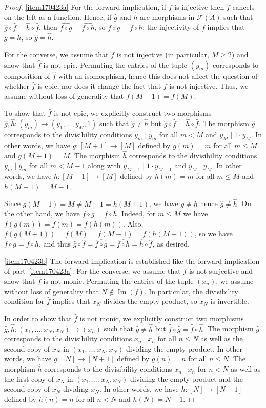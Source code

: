\documentclass[reqno]{amsart}
\theoremstyle{plain}
\theoremstyle{definition}
\newcommand{\im}{\operatorname{Im}}
\renewcommand{\geq}{\geqslant}
\renewcommand{\leq}{\leqslant}
\numberwithin{equation}{lem}
\begin{document}
\begin{proof}
\eqref{item170423a} For the forward implication, 
if $f$ is injective then $f$ cancels on the left as a function. Hence, if 
$\hat{g}$ and $\hat{h}$ are morphisms in $\mathcal{F}(A)$ such that
$\hat{g} \circ \hat{f} = \hat{h}\circ \hat{f}$, then 
$\widehat{f \circ g}= \widehat{f \circ h}$, so  $f \circ g = f \circ h$; the injectivity of $f$ implies that $g = h$, so $\hat{g} = \hat{h}$.

For the converse, we assume that $f$ is not injective (in particular, $M\geq 2$) and show that $\hat f$ is not epic. 
Permuting the entries of the tuple $(y_m)$
corresponds to composition of $\hat f$ with an isomorphism, hence this does not affect the question of whether 
$\hat f$ is epic, nor does it change the fact that $f$ is not injective. 
Thus, we assume without loss of generality that $f(M-1)=f(M)$.

To show that $\hat f$ is not epic, we explicitly construct two morphisms $\hat g,\hat h\colon(y_m)\to(y_1,\ldots,y_M,1)$ such that
$\hat g\neq\hat h$ but $\hat g\circ\hat f=\hat h\circ\hat f$.
The morphism $\hat g$ corresponds to the divisibility conditions $y_m\mid y_m$ for all $m<M$ and $y_M\mid 1\cdot y_M$.
In other words, we have $g\colon[M+1]\to [M]$ defined by $g(m)=m$ for all $m\leq M$ and $g(M+1)=M$.
The morphism $\hat h$ corresponds to the divisibility conditions $y_m\mid y_m$ for all $m<M-1$ 
along with $y_{M-1}\mid 1\cdot y_{M-1}$ and $y_M\mid y_M$.
In other words, we have $h\colon[M+1]\to [M]$ defined by $h(m)=m$ for all $m\leq M$ and $h(M+1)=M-1$.

Since $g(M+1)=M\neq M-1=h(M+1)$, we have $g\neq h$ hence $\hat g\neq\hat h$.
On the other hand, we have $f\circ g=f\circ h$. Indeed, for $m\leq M$ we have
$f(g(m))=f(m)=f(h(m))$.
Also, $f(g(M+1))=f(M)=f(M-1)=f(h(M+1))$, so we have $f\circ g=f\circ h$, and thus
$\hat g\circ\hat f=\widehat{f\circ g}=\widehat{f\circ h}
=\hat h\circ\hat f$,
as desired.

\eqref{item170423b}
The forward implication  is established like the forward implication of part~\eqref{item170423a}.
For the converse, we assume that $f$ is not surjective and show that $\hat f$ is not monic. 
Permuting the entries of the tuple $(x_n)$, we assume without loss of generality that $N\notin\im(f)$.
In particular, the divisibility condition for $\hat f$ implies that $x_N$ divides the empty product, so $x_N$ is invertible.

In order to show that $\hat f$ is not monic, we explicitly construct two morphisms $\hat g,\hat h\colon(x_1,\ldots,x_{N},x_{N})\to(x_n)$ such that
$\hat g\neq\hat h$ but $\hat f\circ\hat g=\hat f\circ\hat h$.
The morphism $\hat g$ corresponds to the divisibility conditions $x_n\mid x_n$ for all $n\leq N$ as well as 
the second copy of $x_{N}$ in $(x_1,\ldots,x_{N},x_{N})$ dividing the empty product.
In other words, we have $g\colon[N]\to [N+1]$ defined by $g(n)=n$ for all $n\leq N$.
The morphism $\hat h$ corresponds to the divisibility conditions $x_n\mid x_n$ for  $n<N$ as well as
the first copy of $x_{N}$ in $(x_1,\ldots,x_{N},x_{N})$ dividing the empty product
and the second copy of $x_N$ dividing $x_N$.
In other words, we have $h\colon[N]\to [N+1]$ defined by $h(n)=n$ for all $n< N$ and $h(N)=N+1$.


\end{proof}
\end{document}
